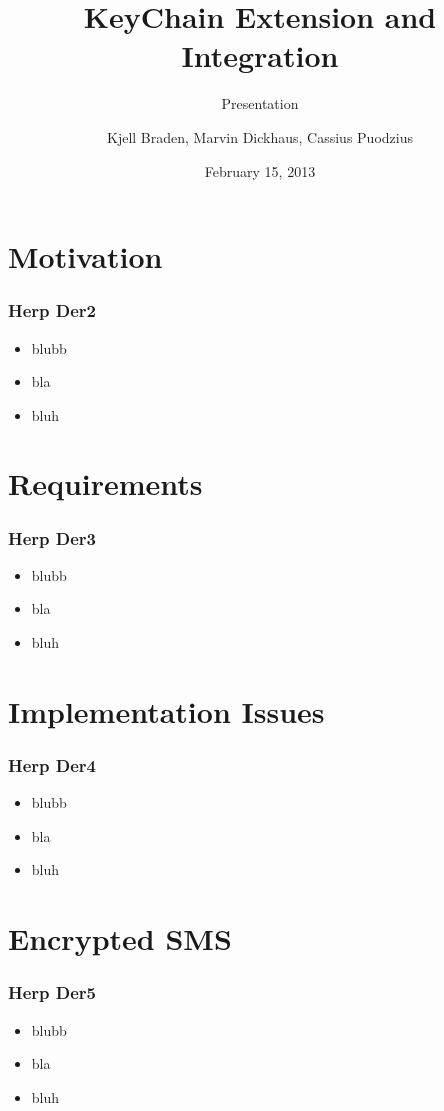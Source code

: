 \documentclass{beamer}
\title{KeyChain Extension and Integration}
\subtitle{Presentation}
\author[Braden, Dickhaus, Puodzius]{Kjell Braden, Marvin Dickhaus, Cassius Puodzius}
\institute{Fachbereich Informatik \\ TU Darmstadt}
\date{February 15, 2013}
\begin{document}
\begin{frame}
	\titlepage
\end{frame}
\begin{frame}
	\tableofcontents
\end{frame}

\section{Motivation}
\begin{frame}
	\tableofcontents[currentsection]
\end{frame}
\begin{frame}
\frametitle{Herp Der2}
\begin{itemize}
	\item blubb
	\item bla
	\item bluh
\end{itemize}
\end{frame}
\section{Requirements}
\begin{frame}
	\tableofcontents[currentsection]
\end{frame}
\begin{frame}
\frametitle{Herp Der3}
\begin{itemize}
	\item blubb
	\item bla
	\item bluh
\end{itemize}
\end{frame}
\section{Implementation Issues}
\begin{frame}
	\tableofcontents[currentsection]
\end{frame}
\begin{frame}
\frametitle{Herp Der4}
\begin{itemize}
	\item blubb
	\item bla
	\item bluh
\end{itemize}
\end{frame}
\section{Encrypted SMS}
\begin{frame}
	\tableofcontents[currentsection]
\end{frame}
\begin{frame}
\frametitle{Herp Der5}
\begin{itemize}
	\item blubb
	\item bla
	\item bluh
\end{itemize}
\end{frame}
\end{document}
